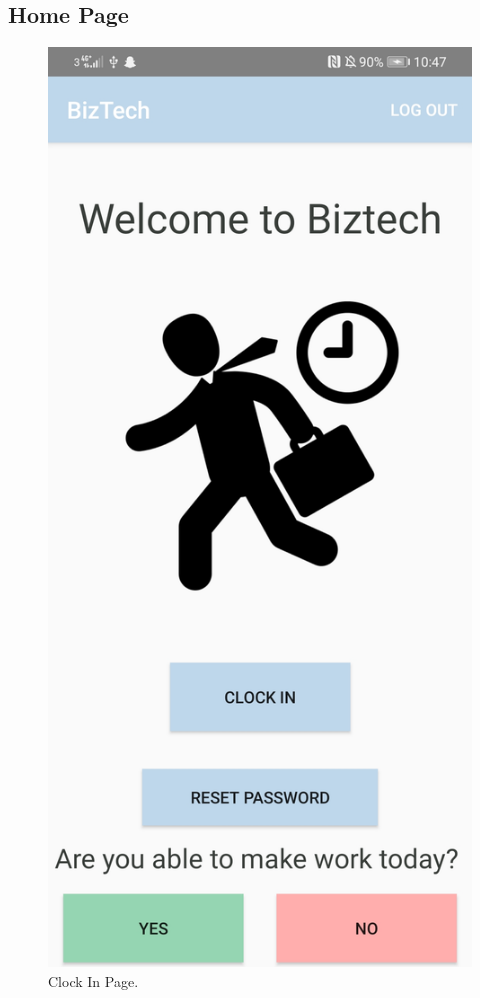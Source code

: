 \subsection{Home Page}
\begin{figure}[!htb]
    \centering
    \includegraphics[scale=0.15]{img/ClockInPage.jpg}
    \caption{Clock In Page.}
    \label{fig}
\end{figure}
